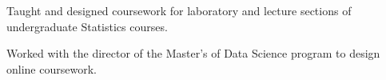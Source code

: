 \documentclass[letterpaper]{deedy-resume} %
\begin{document}
\begin{minipage}[t]{0.65\textwidth}

\hfill{}
\hfill{}
\begin{tightitemize}
\item Taught and designed coursework for laboratory and
  lecture sections of undergraduate Statistics courses.
\item Worked with the director of the Master's of Data Science program
  to design online coursework.
\end{tightitemize}

\end{minipage} %
\end{document}
